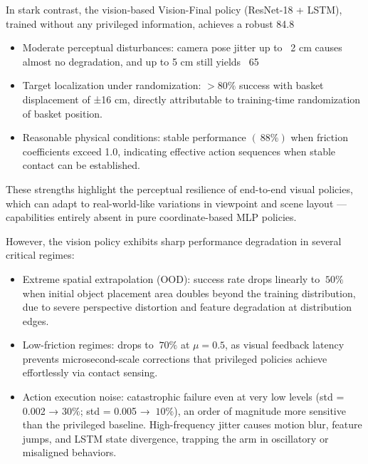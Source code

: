 \documentclass{article} %
\begin{document}
In stark contrast, the vision-based  Vision-Final  policy (ResNet-18 + LSTM), trained without any privileged information, achieves a robust  84.8%

\begin{minipage}{\linewidth}
\begin{itemize}
\item Moderate perceptual disturbances: camera pose jitter up to ~2 cm causes almost no degradation, and up to 5 cm still yields ~65%
\item Target localization under randomization: $>80\%$ success with basket displacement of ±16 cm, directly attributable to training-time randomization of basket position.  
\item Reasonable physical conditions: stable performance $(~88\%)$ when friction coefficients exceed 1.0, indicating effective action sequences when stable contact can be established.
\end{itemize}
\end{minipage}

These strengths highlight the perceptual resilience of end-to-end visual policies, which can adapt to real-world-like variations in viewpoint and scene layout — capabilities entirely absent in pure coordinate-based MLP policies.

However, the vision policy exhibits sharp performance degradation in several critical regimes:

\begin{minipage}{\linewidth}
\begin{itemize}
\item Extreme spatial extrapolation (OOD): success rate drops linearly to $~50\%$ when initial object placement area doubles beyond the training distribution, due to severe perspective distortion and feature degradation at distribution edges.  
\item Low-friction regimes: drops to $~70\%$ at $\mu = 0.5$, as visual feedback latency prevents microsecond-scale corrections that privileged policies achieve effortlessly via contact sensing.  
\item Action execution noise: catastrophic failure even at very low levels (std = 0.002 → $30\%$; std = 0.005 → $~10\%$), an order of magnitude more sensitive than the privileged baseline. High-frequency jitter causes motion blur, feature jumps, and LSTM state divergence, trapping the arm in oscillatory or misaligned behaviors.
\end{itemize}
\end{minipage}
\end{document}

